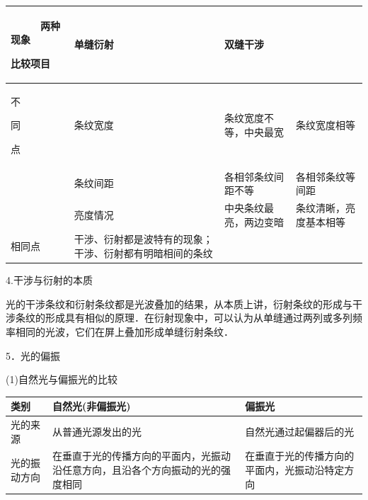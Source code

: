 \begin{longtable}[]{@{}llll@{}}
\toprule
\begin{minipage}[b]{0.22\columnwidth}\raggedright
　　　两种现象

比较项目　　　\strut
\end{minipage} & \begin{minipage}[b]{0.22\columnwidth}\raggedright
单缝衍射\strut
\end{minipage} & \begin{minipage}[b]{0.22\columnwidth}\raggedright
双缝干涉\strut
\end{minipage} & \begin{minipage}[b]{0.22\columnwidth}\raggedright
\strut
\end{minipage}\tabularnewline
\midrule
\endhead
\begin{minipage}[t]{0.22\columnwidth}\raggedright
不

同

点\strut
\end{minipage} & \begin{minipage}[t]{0.22\columnwidth}\raggedright
条纹宽度\strut
\end{minipage} & \begin{minipage}[t]{0.22\columnwidth}\raggedright
条纹宽度不等，中央最宽\strut
\end{minipage} & \begin{minipage}[t]{0.22\columnwidth}\raggedright
条纹宽度相等\strut
\end{minipage}\tabularnewline
& 条纹间距 & 各相邻条纹间距不等 & 各相邻条纹等间距\tabularnewline
& 亮度情况 & 中央条纹最亮，两边变暗 &
条纹清晰，亮度基本相等\tabularnewline
相同点 & 干涉、衍射都是波特有的现象；干涉、衍射都有明暗相间的条纹 &
&\tabularnewline
\bottomrule
\end{longtable}

4.干涉与衍射的本质

光的干涉条纹和衍射条纹都是光波叠加的结果，从本质上讲，衍射条纹的形成与干涉条纹的形成具有相似的原理．在衍射现象中，可以认为从单缝通过两列或多列频率相同的光波，它们在屏上叠加形成单缝衍射条纹．

5．光的偏振

(1)自然光与偏振光的比较

\begin{longtable}[]{@{}lll@{}}
\toprule
类别 & 自然光(非偏振光) & 偏振光\tabularnewline
\midrule
\endhead
光的来源 & 从普通光源发出的光 & 自然光通过起偏器后的光\tabularnewline
光的振动方向 &
在垂直于光的传播方向的平面内，光振动沿任意方向，且沿各个方向振动的光的强度相同
& 在垂直于光的传播方向的平面内，光振动沿特定方向\tabularnewline
\bottomrule
\end{longtable}


